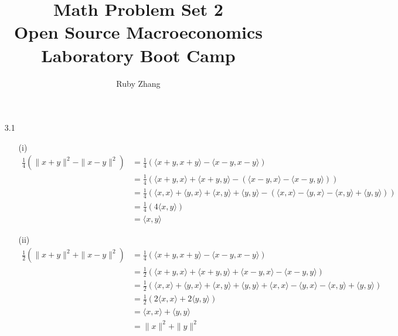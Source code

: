 \documentclass[letterpaper,12pt]{article}
\theoremstyle{definition}
\begin{document}
\title{Math Problem Set 2 \\
Open Source Macroeconomics Laboratory Boot Camp}
\author{Ruby Zhang}
\maketitle

\begin{enumerate}
  \item[3.1]
    \begin{enumerate}
      \item[(i)]
        \begin{align*}
          \frac{1}{4}(\| x+y \|^2 - \|x-y\|^2) &= \frac{1}{4}(\langle x+y,x+y\rangle - \langle x-y,x-y \rangle) \\
          &= \frac{1}{4}(\langle x+y,x \rangle + \langle x+y, y \rangle - (\langle x-y,x \rangle - \langle x-y, y \rangle)) \\
          &= \frac{1}{4}(\langle x,x \rangle + \langle y,x \rangle+ \langle x,y \rangle + \langle y,y \rangle - (\langle x,x \rangle - \langle y,x \rangle - \langle x,y \rangle + \langle y,y \rangle)) \\
          &=\frac{1}{4}(4\langle x,y \rangle ) \\
          &= \langle x,y \rangle
        \end{align*}
      \item[(ii)]
        \begin{align*}
          \frac{1}{2}(\| x+y \|^2 + \|x-y\|^2) &= \frac{1}{4}(\langle x+y,x+y\rangle - \langle x-y,x-y \rangle) \\
          &= \frac{1}{2}(\langle x+y,x \rangle + \langle x+y, y \rangle + \langle x-y,x \rangle - \langle x-y, y \rangle) \\
          &= \frac{1}{2}(\langle x,x \rangle + \langle y,x \rangle+ \langle x,y \rangle + \langle y,y \rangle + \langle x,x \rangle - \langle y,x \rangle - \langle x,y \rangle + \langle y,y \rangle) \\
          &= \frac{1}{2}(2\langle x,x \rangle + 2\langle y,y \rangle) \\
          &= \langle x,x \rangle + \langle y,y \rangle \\
          &= \|x\|^2 + \|y\|^2
        \end{align*}
    \end{enumerate}


\end{enumerate}
\end{document}
